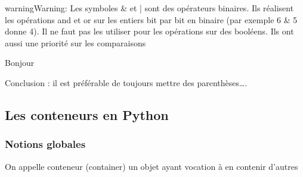 \documentclass[letterpaper,10pt,english]{sphinxhowto}
\begin{document}
\begin{sphinxadmonition}{warning}{Warning:}
\sphinxAtStartPar
Les symboles \& et | sont des opérateurs binaires. Ils réalisent les opérations and et or sur les entiers bit par bit en binaire (par exemple 6 \& 5 donne 4). Il ne faut pas les utiliser pour les opérations sur des booléens. Ils ont aussi une priorité sur les comparaisons
\end{sphinxadmonition}

\begin{sphinxVerbatim}[commandchars=\\\{\}]
\end{sphinxVerbatim}

\begin{sphinxVerbatim}[commandchars=\\\{\}]
  

   
    
   
\end{sphinxVerbatim}

\begin{sphinxVerbatim}[commandchars=\\\{\}]
Bonjour
\end{sphinxVerbatim}

\sphinxAtStartPar
Conclusion : il est préférable de toujours mettre des parenthèses….


\subsection{Les conteneurs en Python}
\label{\detokenize{cours3_conteneur_cours:les-conteneurs-en-python}}\label{\detokenize{cours3_conteneur_cours::doc}}

\subsubsection{Notions globales}
\label{\detokenize{cours3_conteneur_cours:notions-globales}}
\sphinxAtStartPar
On appelle conteneur (container) un objet ayant vocation à en contenir d’autres
\end{document}
